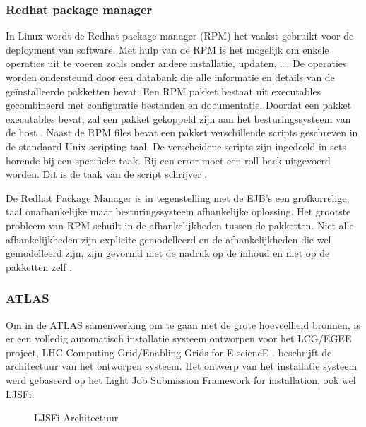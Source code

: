 \subsubsection{Redhat package manager}
In Linux wordt de Redhat package manager (RPM) het vaakst gebruikt voor de deployment van software.
Met hulp van de RPM is het mogelijk om enkele operaties uit te voeren zoals onder andere installatie, updaten, \ldots .
De operaties worden ondersteund door een databank die alle informatie en details van de geïnstalleerde pakketten bevat.
Een RPM pakket bestaat uit executables gecombineerd met configuratie bestanden en documentatie.
Doordat een pakket executables bevat, zal een pakket gekoppeld zijn aan het besturingssysteem van de host \citep{bailey1997maximum}.
Naast de RPM files bevat een pakket verschillende scripts geschreven in de standaard Unix scripting taal.
De verscheidene scripts zijn ingedeeld in sets horende bij een specifieke taak.
Bij een error moet een roll back uitgevoerd worden.
Dit is de taak van de script schrijver \citep{softwareDeployment}.

De Redhat Package Manager is in tegenstelling met de EJB's een grofkorrelige, taal onafhankelijke maar besturingssysteem afhankelijke oplossing.
Het grootste probleem van RPM schuilt in de afhankelijkheden tussen de pakketten.
Niet alle afhankelijkheden zijn explicite gemodelleerd en de afhankelijkheden die wel gemodelleerd zijn, zijn gevormd met de nadruk op de inhoud en niet op de pakketten zelf \citep{softwareDeployment}.  

\subsubsection{ATLAS}\label{sec:ATLAS}
Om in de ATLAS samenwerking om te gaan met de grote hoeveelheid bronnen, is er een volledig automatisch installatie systeem ontworpen voor het LCG/EGEE project, LHC Computing Grid/Enabling Grids for E-sciencE \citep{bird2005lhc}. 
\citet{salvo2008atlas} beschrijft de architectuur van het ontworpen systeem.
Het ontwerp van het installatie systeem werd gebaseerd op het Light Job Submission Framework for installation, ook wel LJSFi.

\begin{figure}[!ht]
\centering
{}
\caption{LJSFi Architectuur \citep{salvo2008atlas}}
\label{fig:ljsfiArchi}
\end{figure}

